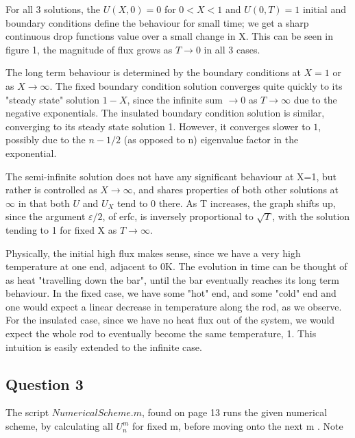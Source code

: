 \documentclass[10pt,a4paper]{report}
\begin{document}
For all 3 solutions, the $U(X,0)=0$ for $0<X<1$ and $U(0,T)=1$ initial and boundary conditions define the behaviour for small time; we get a sharp continuous drop functions value over a small change in X. This can be seen in figure 1, the magnitude of flux grows as $T \rightarrow 0$ in all 3 cases.
\vspace{0.5cm}

The long term behaviour is determined by the boundary conditions at $X=1$ or as $X\rightarrow\infty$. The fixed boundary condition solution converges quite quickly to its "steady state" solution $1-X$, since the infinite sum $\rightarrow 0$ as $T\rightarrow\infty$ due to the negative exponentials. The insulated boundary condition solution is similar, converging to its steady state solution 1. However, it converges slower to $1$, possibly due to the $n-1/2$ (as opposed to n) eigenvalue factor in the exponential. \par
\vspace{0.5cm}

The semi-infinite solution does not have any significant behaviour at X=1, but rather is controlled as $X\rightarrow\infty$, and shares properties of both other solutions at $\infty$ in that both $U$ and $U_X$ tend to 0 there. As T increases, the graph shifts up, since the argument $\varepsilon/2$, of erfc, is inversely proportional to $\sqrt{T}$, with the solution tending to 1 for fixed X as $T\rightarrow\infty$.
\vspace{0.5cm}

Physically, the initial high flux makes sense, since we have a very high temperature at one end, adjacent to 0K. The evolution in time can be thought of as heat "travelling down the bar", until the bar eventually reaches its long term behaviour. In the fixed case, we have some "hot" end, and some "cold" end and one would expect a linear decrease in temperature along the rod, as we observe. For the insulated case, since we have no heat flux out of the system, we would expect the whole rod to eventually become the same temperature, 1. This intuition is easily extended to the infinite case.

\newpage

\subsection*{Question 3}

The script $NumericalScheme.m$, found on page 13 runs the given numerical scheme, by calculating all $U_n^m$ for fixed m, before moving onto the next m	. Note
\end{document}
